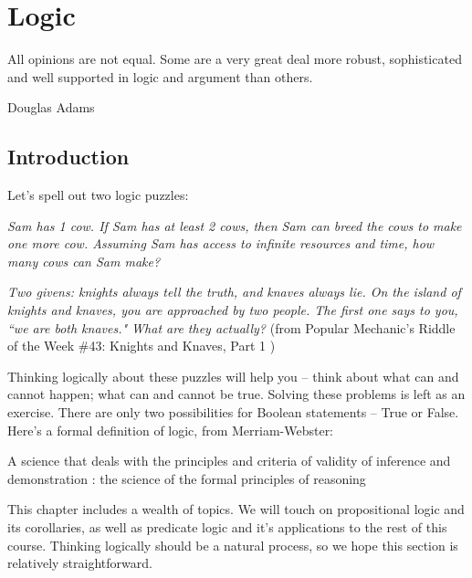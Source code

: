 \documentclass[main.tex]{subfiles}
\begin{document}
\chapter{Logic}
\label{chapter:logic}

\epigraph{All opinions are not equal. Some are a very great deal more robust, sophisticated and well supported in logic and argument than others.}{Douglas Adams}

\minitoc

\section{Introduction}

Let's spell out two logic puzzles:

\begin{center}
	\textit{Sam has 1 cow. If Sam has at least 2 cows, then Sam can breed the cows to make one more cow. Assuming Sam has access to infinite resources and time, how many cows can Sam make?}
\end{center}

\begin{center}
	\textit{Two givens: knights always tell the truth, and knaves always lie. On the island of knights and knaves, you are approached by two people. The first one says to you, ``we are both knaves." What are they actually?} (from Popular Mechanic's Riddle of the Week \#43: Knights and Knaves, Part 1 \cite{pop-mech})
\end{center}

Thinking logically about these puzzles will help you -- think about what can and cannot happen; what can and cannot be true. Solving these problems is left as an exercise. There are only two possibilities for Boolean statements -- True or False. Here's a formal definition of logic, from Merriam-Webster:

\begin{defn}
	A science that deals with the principles and criteria of validity of inference and demonstration : the science of the formal principles of reasoning \cite{logic}
\end{defn}

This chapter includes a wealth of topics. We will touch on propositional logic and its corollaries, as well as predicate logic and it's applications to the rest of this course. Thinking logically should be a natural process, so we hope this section is relatively straightforward.
\end{document}
